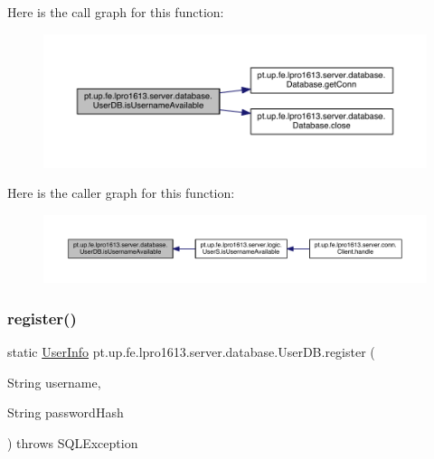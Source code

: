 Here is the call graph for this function\+:
\nopagebreak
\begin{figure}[H]
\begin{center}
\leavevmode
\includegraphics[width=350pt]{classpt_1_1up_1_1fe_1_1lpro1613_1_1server_1_1database_1_1_user_d_b_ab6501b54b7768d7d854a68dd9ed1b830_cgraph}
\end{center}
\end{figure}
Here is the caller graph for this function\+:
\nopagebreak
\begin{figure}[H]
\begin{center}
\leavevmode
\includegraphics[width=350pt]{classpt_1_1up_1_1fe_1_1lpro1613_1_1server_1_1database_1_1_user_d_b_ab6501b54b7768d7d854a68dd9ed1b830_icgraph}
\end{center}
\end{figure}
\hypertarget{classpt_1_1up_1_1fe_1_1lpro1613_1_1server_1_1database_1_1_user_d_b_a1bcefeca4058dd57c0d2c0a7387af2e1}{}\label{classpt_1_1up_1_1fe_1_1lpro1613_1_1server_1_1database_1_1_user_d_b_a1bcefeca4058dd57c0d2c0a7387af2e1} 
\subsubsection{\texorpdfstring{register()}{register()}}
{\footnotesize\ttfamily static \hyperlink{classpt_1_1up_1_1fe_1_1lpro1613_1_1sharedlib_1_1structs_1_1_user_info}{User\+Info} pt.\+up.\+fe.\+lpro1613.\+server.\+database.\+User\+D\+B.\+register (\begin{DoxyParamCaption}\item[{String}]{username,  }\item[{String}]{password\+Hash }\end{DoxyParamCaption}) throws S\+Q\+L\+Exception\hspace{0.3cm}{\ttfamily [static]}}

